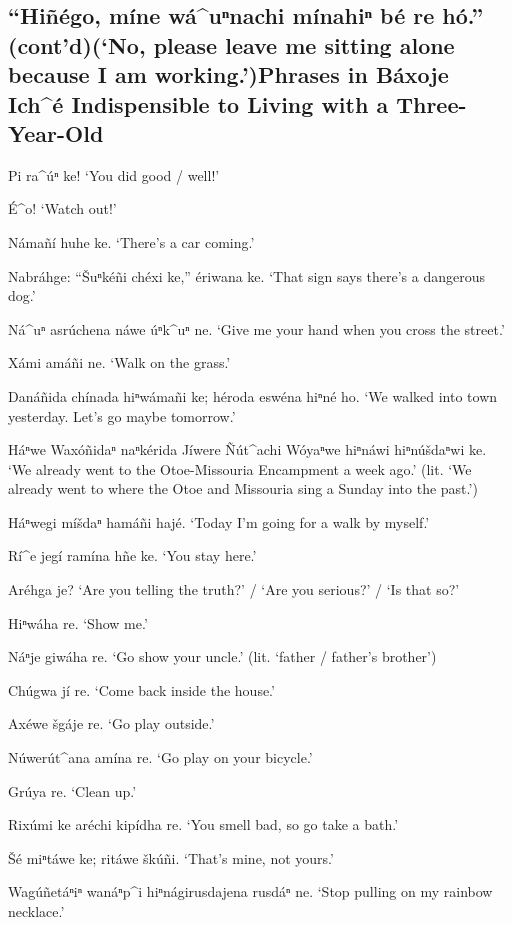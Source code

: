 \documentclass[output=paper]{LSP/langsci}
\begin{document}
\subsection*{``Hiñégo, míne wá\^{ }uⁿnachi mínahiⁿ bé re hó.'' (cont'd)\newline (`No, please leave me sitting alone because I am working.')\newline Phrases in Báxoje Ich\^{ }é Indispensible to Living with a Three-Year-Old}
\begin{list}{}{} \itemsep1pt \parskip0pt 
\item{Pi ra\^{ }úⁿ ke! `You did good / well!'}
\item{\'E\^{ }o! `Watch out!'}
\item{Námañí huhe ke. `There's a car coming.'}
\item{Nabráhge: ``\v{S}uⁿkéñi chéxi ke,'' ériwana ke. `That sign says there's a dangerous dog.'}
\item{Ná\^{ }uⁿ asrúchena náwe úⁿk\^{ }uⁿ ne. `Give me your hand when you cross the street.'}
\item{Xámi amáñi ne. `Walk on the grass.'}
\item{Danáñida chínada hiⁿwámañi ke; héroda eswéna hiⁿné ho. `We walked into town yesterday. Let's go maybe tomorrow.'}
\item{Háⁿwe Waxóñidaⁿ naⁿkérida Jíwere \~Nút\^{ }achi Wóyaⁿwe hiⁿnáwi hiⁿnúšdaⁿwi ke. `We already went to the Otoe-Missouria Encampment a week ago.' (lit. `We already went to where the Otoe and Missouria sing a Sunday into the past.')}
\item{Háⁿwegi míšdaⁿ hamáñi hajé.  `Today I'm going for a walk by myself.'}
\item{Rí\^{ }e jegí ramína hñe ke. `You stay here.'}
\item{Aréhga je? `Are you telling the truth?' / `Are you serious?' / `Is that so?'}
\item{Hiⁿwáha re. `Show me.'}
\item{Náⁿje giwáha re. `Go show your uncle.' (lit. `father / father's brother')}
\item{Chúgwa jí re.	`Come back inside the house.'}
\item{}
\item{Axéwe šgáje re. `Go play outside.'}
\item{Núwerút\^{ }ana amína re.	`Go play on your bicycle.'}
\item{Grúya re.	`Clean up.'}
\item{Rixúmi ke aréchi kipídha re. `You smell bad, so go take a bath.'}
\item{\v{S}é miⁿtáwe ke;  ritáwe škúñi. `That's mine, not yours.'}
\item{Wagúñetáⁿiⁿ wanáⁿp\^{ }i hiⁿnágirusdajena rusdáⁿ ne. `Stop pulling on my rainbow necklace.'}
\end{list} 
\end{document}
